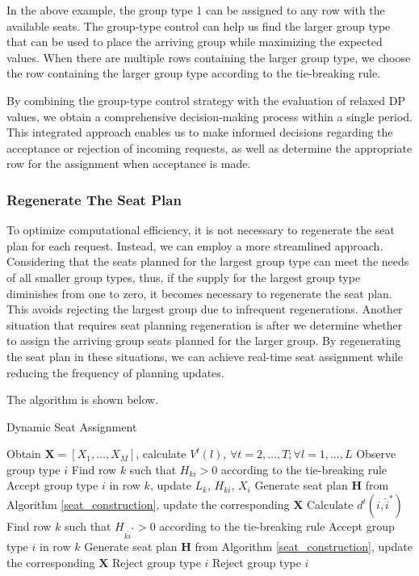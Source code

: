 In the above example, the group type 1 can be assigned to any row with the available seats. The group-type control can help us find the larger group type that can be used to place the arriving group while maximizing the expected values. When there are multiple rows containing the larger group type, we choose the row containing the larger group type according to the tie-breaking rule.

By combining the group-type control strategy with the evaluation of relaxed DP values, we obtain a comprehensive decision-making process within a single period. This integrated approach enables us to make informed decisions regarding the acceptance or rejection of incoming requests, as well as determine the appropriate row for the assignment when acceptance is made.

\subsubsection{Regenerate The Seat Plan}
To optimize computational efficiency, it is not necessary to regenerate the seat plan for each request. Instead, we can employ a more streamlined approach. Considering that the seats planned for the largest group type can meet the needs of all smaller group types, thus, if the supply for the largest group type diminishes from one to zero, it becomes necessary to regenerate the seat plan. This avoids rejecting the largest group due to infrequent regenerations. Another situation that requires seat planning regeneration is after we determine whether to assign the arriving group seats planned for the larger group. By regenerating the seat plan in these situations, we can achieve real-time seat assignment while reducing the frequency of planning updates.

The algorithm is shown below.

\begin{algorithm}[H]
  \caption{Dynamic Seat Assignment}
  Obtain $\bm{X} = [X_1, \ldots, X_M]$, calculate $V^{t}(l)$, $\forall t =2, \ldots, T; \forall l = 1, \ldots, L$\;
  {Observe group type ${i}$\;
    {
    {Find row $k$ such that $H_{k{i}} >0$ according to the tie-breaking rule\; 
    Accept group type $i$ in row $k$, update $L_{k}$, $H_{ki}$, $X_{i}$\;
    {Generate seat plan $\bm{H}$ from Algorithm \ref{seat_construction}, update the corresponding $\bm{X}$\;}}
    {Calculate $d^{t}({i}, \hat{i}^{*})$\;
    {Find row $k$ such that $H_{k \hat{i}^{*}} > 0$ according to the tie-breaking rule\;
     Accept group type $i$ in row $k$\;
    Generate seat plan $\bm{H}$ from Algorithm \ref{seat_construction}, update the corresponding $\bm{X}$\;}
    {Reject group type ${i}$\;}}}
    {Reject group type ${i}$\;}}
\end{algorithm}
